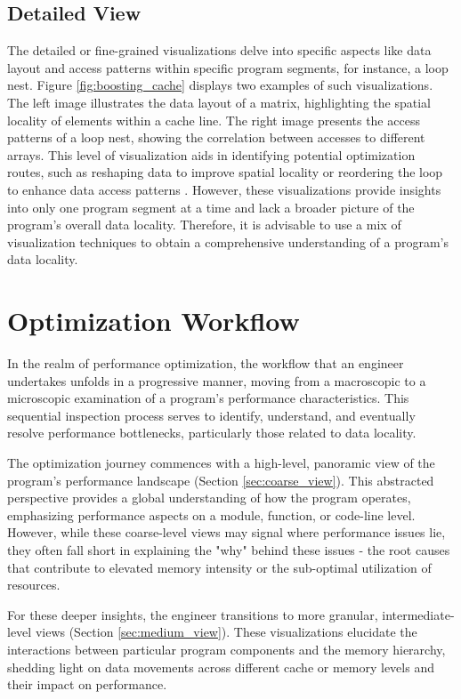 \subsection{Detailed View}\label{sec:fine_view}
The detailed or fine-grained visualizations delve into specific aspects like data layout and access patterns within specific program segments, for instance, a loop nest. Figure \ref{fig:boosting_cache} displays two examples of such visualizations. The left image illustrates the data layout of a matrix, highlighting the spatial locality of elements within a cache line. The right image presents the access patterns of a loop nest, showing the correlation between accesses to different arrays. This level of visualization aids in identifying potential optimization routes, such as reshaping data to improve spatial locality or reordering the loop to enhance data access patterns \cite{schaad2022boosting}. However, these visualizations provide insights into only one program segment at a time and lack a broader picture of the program's overall data locality. Therefore, it is advisable to use a mix of visualization techniques to obtain a comprehensive understanding of a program's data locality.


\section{Optimization Workflow}\label{sec:optimization_workflow}
In the realm of performance optimization, the workflow that an engineer undertakes unfolds in a progressive manner, moving from a macroscopic to a microscopic examination of a program's performance characteristics. This sequential inspection process serves to identify, understand, and eventually resolve performance bottlenecks, particularly those related to data locality.

The optimization journey commences with a high-level, panoramic view of the program's performance landscape (Section \ref{sec:coarse_view}). This abstracted perspective provides a global understanding of how the program operates, emphasizing performance aspects on a module, function, or code-line level. However, while these coarse-level views may signal where performance issues lie, they often fall short in explaining the "why" behind these issues - the root causes that contribute to elevated memory intensity or the sub-optimal utilization of resources.

For these deeper insights, the engineer transitions to more granular, intermediate-level views (Section \ref{sec:medium_view}). These visualizations elucidate the interactions between particular program components and the memory hierarchy, shedding light on data movements across different cache or memory levels and their impact on performance.

